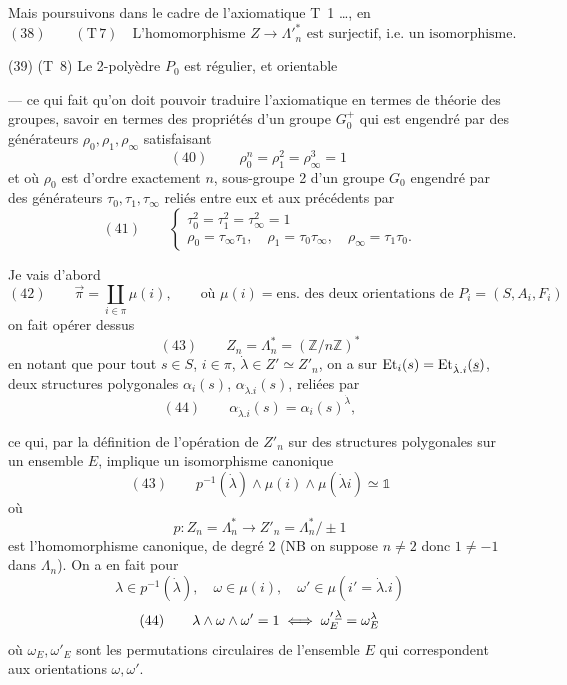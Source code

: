 \documentclass[11pt,a4paper]{article}
\begin{document}
Mais poursuivons dans le cadre de l'axiomatique T~1 …, en 
\[
(38) \qquad (\mathrm{T}\,7) \quad \text{L'homomorphisme } Z \to \Lambda'^{*}_n \text{ est surjectif, i.e. un isomorphisme.}
\]

(39) (T~8) Le 2-polyèdre $P_0$ est régulier, et orientable

— ce qui fait qu'on doit pouvoir traduire l'axiomatique en termes de théorie des groupes, savoir en termes des propriétés d'un groupe $G_0^{+}$ qui est engendré par des générateurs $\rho_0, \rho_1, \rho_\infty$ satisfaisant
\[
(40) \qquad \boxed{\ \rho_0^{n} = \rho_1^{2} = \rho_\infty^{3} = 1\ }
\]
et où $\rho_0$ est d'ordre exactement $n$, sous-groupe  2 d'un groupe $G_0$ engendré par des générateurs $\tau_0, \tau_1, \tau_\infty$ reliés entre eux et aux précédents par
\[
(41) \qquad \begin{cases} \tau_0^{2} = \tau_1^{2} = \tau_\infty^{2} = 1 \\ \rho_0 = \tau_\infty \tau_1, \quad \rho_1 = \tau_0 \tau_\infty, \quad \rho_\infty = \tau_1 \tau_0 . \end{cases}
\]

Je vais d'abord    
\[
(42) \qquad \vec{\pi} = \coprod_{i \in \pi} \mu(i), \qquad \text{où } \mu(i) = \text{ens.\ des deux orientations de } P_i = (S, A_i, F_i)
\]
on fait opérer dessus 
\[
(43) \qquad Z_n = \Lambda_n^{*} = (\mathbb{Z}/n\mathbb{Z})^{*}
\]
en notant que pour tout $s \in S$, $i \in \pi$, \struck{\ill{}} $\dot\lambda \in Z' \simeq Z'_n$, on a sur $\mathrm{Et}_i(s) = \mathrm{Et}_{\dot\lambda . i}(\uncertain{s})$, deux structures polygonales $\alpha_i(s)$, $\alpha_{\dot\lambda . i}(s)$, reliées par
\[
(44) \qquad \alpha_{\dot\lambda . i}(s) = \alpha_i(s)^{\dot\lambda},
\]

ce qui, par la définition de l'opération de $Z'_n$ sur  des structures polygonales sur un ensemble $E$, \struck{\ill{}} implique  un isomorphisme canonique
\[
(43) \qquad p^{-1}(\dot\lambda) \wedge \mu(i) \wedge \mu(\dot\lambda i) \simeq \mathbb{1}
\]
où
\[
p : Z_n = \Lambda_n^{*} \longrightarrow Z'_n = \Lambda_n^{*}/\pm 1
\]
est l'homomorphisme canonique, \struck{\ill{}} de degré 2 (NB on suppose $n \neq 2$ donc $1 \neq -1$ dans $\Lambda_n$). On a en fait pour
\[
\lambda \in p^{-1}(\dot\lambda), \quad \omega \in \mu(i), \quad \omega' \in \mu(i' = \dot\lambda . i)
\]
\[
(44) \qquad \lambda \wedge \omega \wedge \omega' = 1 \iff \omega'^{\,\uncertain{\lambda}}_{E} = \omega_E^{\lambda}
\]
où $\omega_E, \omega'_E$ sont \struck{\ill{}} les permutations circulaires de l'ensemble  $E$ qui correspondent aux orientations $\omega, \omega'$.
\end{document}
